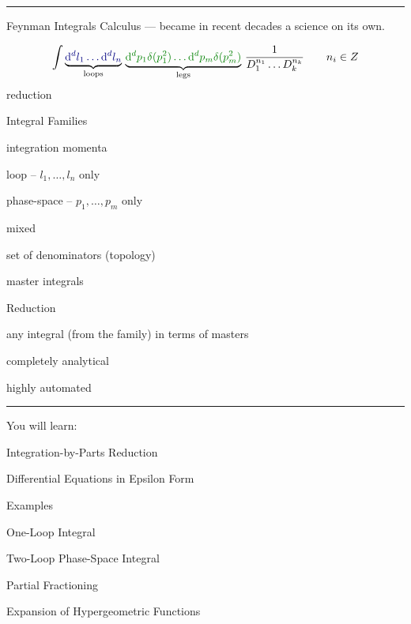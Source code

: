 \documentclass[11pt]{article}
\newcommand{\titleb}[2]{{\color{Blue}{\LARGE #1}\hfill{\Large #2}\vspace{-2mm}\par\rule{\textwidth}{1pt}\vs}}
\newcommand{\titlea}[1]{\titleb{#1}{}}
\newcommand{\people}[1]{{\color{Magenta}#1}}
\begin{document}
\titlea{Introduction}

Feynman Integrals Calculus --- became in recent decades a science on its own. 

  \begin{equation*}
    \int {\color{Black}\underbrace{ \color{NavyBlue}\D^d l_1 \ldots \D^d l_n}_{\text{loops}}} \,\, 
         {\color{Black}\underbrace{\color{Green} \D^d p_1 \delta(p_1^2) \ldots \D^d p_m \delta(p_m^2)}_{\text{legs}}} \,\, \frac{1}{D_1^{n_1} \ldots D_k^{n_k}}
         \qquad n_i \in Z
  \end{equation*}
  reduction
 \bi
   \item Integral Families
   \bi
     \item integration momenta
     \bi
       \item loop -- $l_1,\ldots,l_n$ only
       \item phase-space -- $p_1,\ldots,p_m$ only
       \item mixed 
     \ei
     \item set of denominators (topology)
     \item master integrals
   \ei
   \item Reduction
   \bi
     \item any integral (from the family) in terms of masters
     \bi
       \item {}
     \ei
     \item completely analytical
     \item highly automated
   \ei
 \ei
\newpage
 

\titlea{Plan for Today}

\vs
You will learn:
\bi
  \item \people{Integration-by-Parts} Reduction
  \bi
    \item \litered
  \ei
  \item Differential Equations in \people{Epsilon Form}
  \bi
    \item \fuchsia
  \ei
  \item \people{Examples}
  \bn
    \item One-Loop Integral
    \item Two-Loop Phase-Space Integral
  \en
  \item \people{Partial Fractioning}
  \item Expansion of \people{Hypergeometric Functions}
\ei
\newpage
\end{document}

